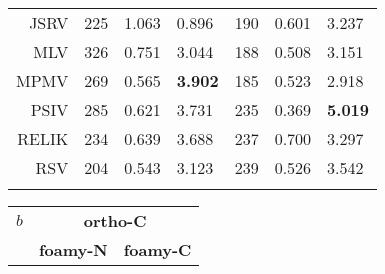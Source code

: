 \begin{table}
\begin{tabular}{r|lll|lll|}
JSRV   &  225  & 1.063 &      0.896  &  190  & 0.601 &      3.237  \\
MLV    &  326  & 0.751 &      3.044  &  188  & 0.508 &      3.151  \\
MPMV   &  269  & 0.565 & {\bf 3.902} &  185  & 0.523 &      2.918  \\
PSIV   &  285  & 0.621 &      3.731  &  235  & 0.369 & {\bf 5.019} \\
RELIK  &  234  & 0.639 &      3.688  &  237  & 0.700 &      3.297  \\
RSV    &  204  & 0.543 &      3.123  &  239  & 0.526 &      3.542  \\
\hline \hline
\vspace{10pt}
\end{tabular}
\begin{tabular}{r|lll|lll|}
$b$  & \multicolumn{6}{c|}{\bf ortho-C} \\
     & \multicolumn{3}{c|}{\bf foamy-N} & \multicolumn{3}{c|}{\bf foamy-C}  \\

\end{tabular}
\end{table}
